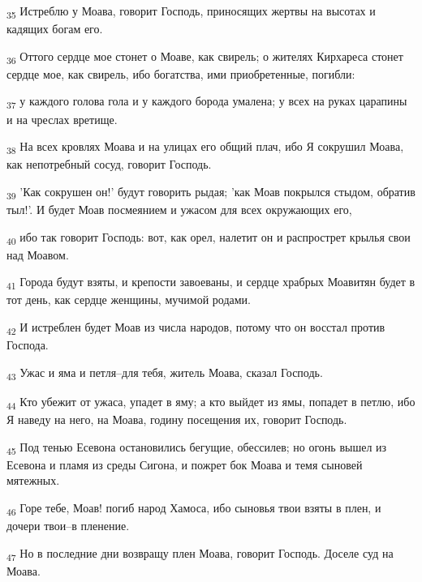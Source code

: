 \begin{tcolorbox}
\textsubscript{35} Истреблю у Моава, говорит Господь, приносящих жертвы на высотах и кадящих богам его.
\end{tcolorbox}
\begin{tcolorbox}
\textsubscript{36} Оттого сердце мое стонет о Моаве, как свирель; о жителях Кирхареса стонет сердце мое, как свирель, ибо богатства, ими приобретенные, погибли:
\end{tcolorbox}
\begin{tcolorbox}
\textsubscript{37} у каждого голова гола и у каждого борода умалена; у всех на руках царапины и на чреслах вретище.
\end{tcolorbox}
\begin{tcolorbox}
\textsubscript{38} На всех кровлях Моава и на улицах его общий плач, ибо Я сокрушил Моава, как непотребный сосуд, говорит Господь.
\end{tcolorbox}
\begin{tcolorbox}
\textsubscript{39} 'Как сокрушен он!' будут говорить рыдая; 'как Моав покрылся стыдом, обратив тыл!'. И будет Моав посмеянием и ужасом для всех окружающих его,
\end{tcolorbox}
\begin{tcolorbox}
\textsubscript{40} ибо так говорит Господь: вот, как орел, налетит он и распрострет крылья свои над Моавом.
\end{tcolorbox}
\begin{tcolorbox}
\textsubscript{41} Города будут взяты, и крепости завоеваны, и сердце храбрых Моавитян будет в тот день, как сердце женщины, мучимой родами.
\end{tcolorbox}
\begin{tcolorbox}
\textsubscript{42} И истреблен будет Моав из числа народов, потому что он восстал против Господа.
\end{tcolorbox}
\begin{tcolorbox}
\textsubscript{43} Ужас и яма и петля--для тебя, житель Моава, сказал Господь.
\end{tcolorbox}
\begin{tcolorbox}
\textsubscript{44} Кто убежит от ужаса, упадет в яму; а кто выйдет из ямы, попадет в петлю, ибо Я наведу на него, на Моава, годину посещения их, говорит Господь.
\end{tcolorbox}
\begin{tcolorbox}
\textsubscript{45} Под тенью Есевона остановились бегущие, обессилев; но огонь вышел из Есевона и пламя из среды Сигона, и пожрет бок Моава и темя сыновей мятежных.
\end{tcolorbox}
\begin{tcolorbox}
\textsubscript{46} Горе тебе, Моав! погиб народ Хамоса, ибо сыновья твои взяты в плен, и дочери твои--в пленение.
\end{tcolorbox}
\begin{tcolorbox}
\textsubscript{47} Но в последние дни возвращу плен Моава, говорит Господь. Доселе суд на Моава.
\end{tcolorbox}
